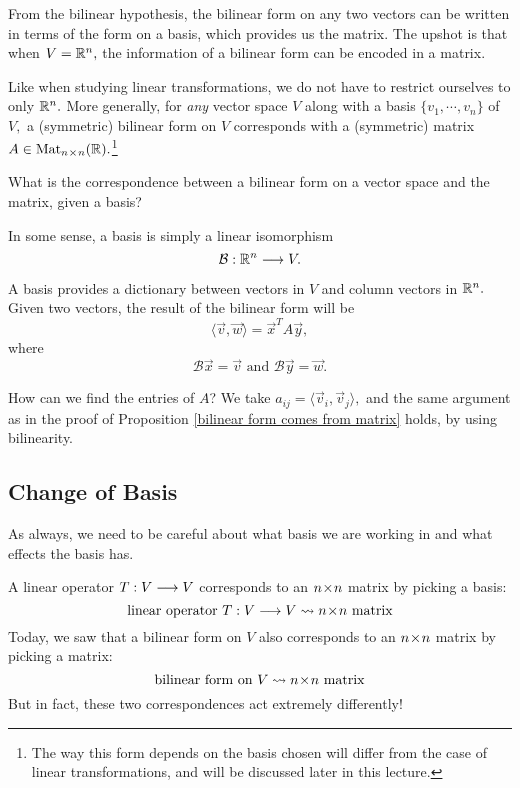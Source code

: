 From the bilinear hypothesis, the bilinear form on any two vectors can be written in terms of the form on a basis, which provides us the matrix. The upshot is that when $V = \mathbb R^n,$ the information of a bilinear form can be encoded in a matrix.

Like when studying linear transformations, we do not have to restrict ourselves to only $\mathbb R^n.$ More generally, for \emph{any} vector space $V$ along with a basis $\{v_1, \cdots, v_n\}$ of $V,$ a (symmetric) bilinear form on $V$ corresponds with a (symmetric) matrix $A \in \text{Mat}_{n \hspace{0.05em}{\times}\hspace{0.05em} n}(\mathbb R).$\footnote{The way this form depends on the basis chosen will differ from the case of linear transformations, and will be discussed later in this lecture.}

\begin{qq}
What is the correspondence between a bilinear form on a vector space and the matrix, given a basis?
\end{qq}

In some sense, a basis is simply a linear isomorphism 
\[
\mathcal{B}: \mathbb R^n \longrightarrow V.
\]

A basis provides a dictionary between vectors in $V$ and column vectors in $\mathbb R^n.$ Given two vectors, the result of the bilinear form will be
\[
\langle \vec{v}, \vec{w} \rangle = \vec{x}^T A\vec{y},
\]
where \[
\mathcal{B}\vec{x} = \vec{v} \text{ and } \mathcal{B}\vec{y} = \vec{w}.
\] 

How can we find the entries of $A$? We take $a_{ij} = \langle \vec{v}_i, \vec{v}_j\rangle,$ and the same argument as in the proof of Proposition \ref{bilinear form comes from matrix} holds, by using bilinearity.
\subsection{Change of Basis}
As always, we need to be careful about what basis we are working in and what effects the basis has.

\begin{note}[Warning!]
A linear operator $T: V \longrightarrow V$ corresponds to an $n \hspace{0.05em}{\times}\hspace{0.05em} n$ matrix by picking a basis: \[\text{linear operator } T: V \longrightarrow V \leadsto n \hspace{0.05em}{\times}\hspace{0.05em} n \text{ matrix} \] Today, we saw that a bilinear form on $V$ also corresponds to an $n \hspace{0.05em}{\times}\hspace{0.05em} n$ matrix by picking a matrix:  \[\text{bilinear form on } V \leadsto n \hspace{0.05em}{\times}\hspace{0.05em} n \text{ matrix} \] But in fact, these two correspondences act extremely differently! 
\end{note}

